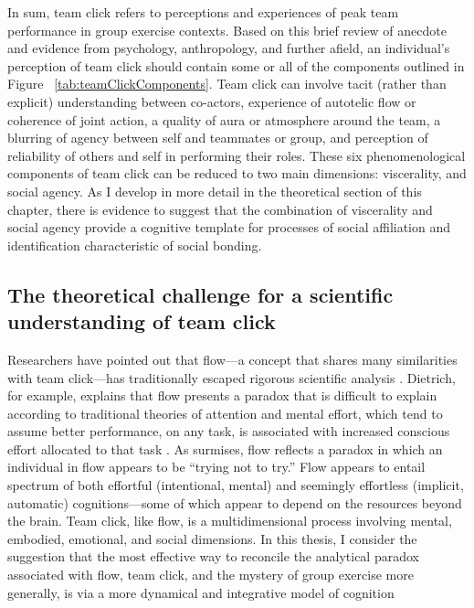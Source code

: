 \begin{CJK}{UTF8}{gbsn}
In sum, team click refers to perceptions and experiences of peak team performance in group exercise contexts.  Based on this brief review of anecdote and evidence from psychology, anthropology, and further afield, an individual's perception of team click should contain some or all of the components outlined in Figure ~\ref{tab:teamClickComponents}.  Team click can involve tacit (rather than explicit) understanding between co-actors, experience of autotelic flow or coherence of joint action, a quality of aura or atmosphere around the team, a blurring of agency between self and teammates or group, and perception of reliability of others and self in performing their roles.  These six phenomenological components of team click can be reduced to two main dimensions: viscerality, and social agency.  As I develop in more detail in the theoretical section of this chapter, there is evidence to suggest that the combination of viscerality and social agency provide a cognitive template for processes of social affiliation and identification characteristic of social bonding.



\subsection{The theoretical challenge for a scientific understanding of team click}
Researchers have pointed out that flow---a concept that shares many similarities with team click---has traditionally escaped rigorous scientific analysis \citep{Dietrich2010a,Slingerland2014}.  Dietrich, for example, explains that flow presents a paradox that is difficult to explain according to traditional theories of attention and mental effort, which tend to assume better performance, on any task, is associated with increased conscious effort allocated to that task \citep{Dietrich2004b}.  As \textcite{Slingerland2014} surmises, flow reflects a paradox in which an individual in flow appears to be ``trying not to try.''  Flow appears to entail spectrum of both effortful (intentional, mental) and seemingly effortless (implicit, automatic) cognitions---some of which appear to depend on the resources beyond the brain.  Team click, like flow, is a multidimensional process involving mental, embodied, emotional, and social dimensions.  In this thesis, I consider the suggestion that the most effective way to reconcile the analytical paradox associated with flow, team click, and the mystery of group exercise more generally, is via a more dynamical and integrative model of cognition \citep{Clark2015}


\end{CJK}
